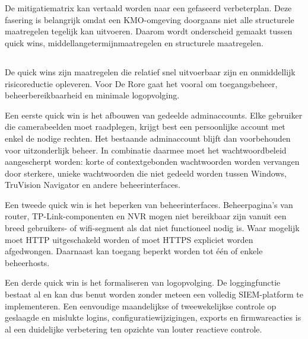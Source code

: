 \section{}%
\label{sec:verbeterplan}

De mitigatiematrix kan vertaald worden naar een gefaseerd verbeterplan. Deze fasering is belangrijk omdat een KMO-omgeving doorgaans niet alle structurele maatregelen tegelijk kan uitvoeren. Daarom wordt onderscheid gemaakt tussen quick wins, middellangetermijnmaatregelen en structurele maatregelen.

\subsection{}%
\label{subsec:quick-wins}

De quick wins zijn maatregelen die relatief snel uitvoerbaar zijn en onmiddellijk risicoreductie opleveren. Voor De Rore gaat het vooral om toegangsbeheer, beheerbereikbaarheid en minimale logopvolging.

Een eerste quick win is het afbouwen van gedeelde adminaccounts. Elke gebruiker die camerabeelden moet raadplegen, krijgt best een persoonlijke account met enkel de nodige rechten. Het bestaande adminaccount blijft dan voorbehouden voor uitzonderlijk beheer. In combinatie daarmee moet het wachtwoordbeleid aangescherpt worden: korte of contextgebonden wachtwoorden worden vervangen door sterkere, unieke wachtwoorden die niet gedeeld worden tussen Windows, TruVision Navigator en andere beheerinterfaces.

Een tweede quick win is het beperken van beheerinterfaces. Beheerpagina's van router, TP-Link-componenten en NVR mogen niet bereikbaar zijn vanuit een breed gebruikers- of wifi-segment als dat niet functioneel nodig is. Waar mogelijk moet HTTP uitgeschakeld worden of moet HTTPS expliciet worden afgedwongen. Daarnaast kan toegang beperkt worden tot één of enkele beheerhosts.

Een derde quick win is het formaliseren van logopvolging. De loggingfunctie bestaat al en kan dus benut worden zonder meteen een volledig SIEM-platform te implementeren. Een eenvoudige maandelijkse of tweewekelijkse controle op geslaagde en mislukte logins, configuratiewijzigingen, exports en firmwareacties is al een duidelijke verbetering ten opzichte van louter reactieve controle.

